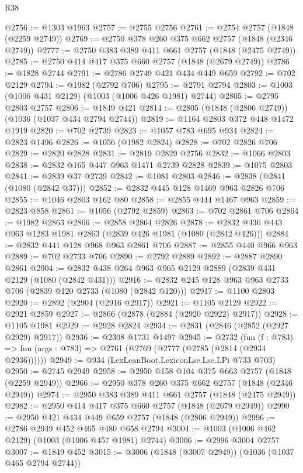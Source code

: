 \begin{lexlean}{R38}
\begin{coremodule}
@2756 := @1303 @1963
@2757 := @2755 @2756
@2761 := @2754 @2757 (@1848 (@2259 @2749))
@2769 := @2750 @378 @260 @375 @662 @2757 (@1848 (@2346 @2749))
@2777 := @2750 @383 @389 @411 @661 @2757 (@1848 (@2475 @2749))
@2785 := @2750 @414 @417 @375 @660 @2757 (@1848 (@2679 @2749))
@2786 := @1828 @2744
@2791 := @2786 @2749 @421 @434 @449 @659
@2792 := @702 @2129
@2794 := @1982 (@2792 @706)
@2795 := @2791 @2794
@2803 := @1003 (@1006 @431 @2129) (@1003 (@1006 @426 @1981) @2744)
@2805 := @2795 @2803 @2757
@2806 := @1849 @421
@2814 := @2805 (@1848 (@2806 @2749)) (@1036 (@1037 @434 @2794 @2744))
@2819 := @1164 @2803 @372 @448 @1472 @1919
@2820 := @702 @2739
@2823 := @1057 @783 @695 @934
@2824 := @2823 @1496
@2826 := @1056 (@1982 @2824)
@2828 := @702 @2826 @706
@2829 := @2820 @2828
@2831 := @2819 @2829 @2756
@2832 := @1066 @2803
@2838 := @2832 @165 @447 @963 @1471 @2739 @2828
@2839 := @1075 @2803
@2841 := @2839 @37 @2739
@2842 := @1081 @2803
@2846 := @2838 (@2841 (@1080 (@2842 @37)))
@2852 := @2832 @445 @128 @1469 @963 @2826 @706
@2855 := @1046 @2803 @162 @80
@2858 := @2855 @444 @1467 @963
@2859 := @2823 @858
@2861 := @1056 (@2792 @2859)
@2863 := @702 @2861 @706
@2864 := @1982 @2863
@2866 := @2858 @2864 @2826
@2878 := @2832 @436 @443 @963 @1283 @1981 @2863 (@2839 @426 @1981 (@1080 (@2842 @426)))
@2884 := @2832 @441 @128 @968 @963 @2861 @706
@2887 := @2855 @440 @966 @963
@2889 := @702 @2733 @706
@2890 := @2792 @2889
@2892 := @2887 @2890 @2861
@2904 := @2832 @438 @264 @963 @965 @2129 @2889 (@2839 @431 @2129 (@1080 (@2842 @431)))
@2916 := @2832 @245 @128 @963 @963 @2733 @706 (@2839 @120 @2733 (@1080 (@2842 @120)))
@2917 := @1100 @2803
@2920 := @2892 (@2904 (@2916 @2917))
@2921 := @1105 @2129
@2922 := @2921 @2859
@2927 := @2866 (@2878 (@2884 (@2920 @2922) @2917))
@2928 := @1105 @1981
@2929 := @2928 @2824
@2934 := @2831 (@2846 (@2852 (@2927 @2929) @2917))
@2936 := @2308 @1731 @1497
@2945 := @2732
    (fun (f : @783) => fun (args : @783) => @2761 (@2769 (@2777 (@2785 (@2814 (@2934 @2936))))))
@2949 := @934 (LexLeanBoot.LexiconLse.Lse.LPi @733 @703)
@2950 := @2745 @2949
@2958 := @2950 @158 @104 @375 @663 @2757 (@1848 (@2259 @2949))
@2966 := @2950 @378 @260 @375 @662 @2757 (@1848 (@2346 @2949))
@2974 := @2950 @383 @389 @411 @661 @2757 (@1848 (@2475 @2949))
@2982 := @2950 @414 @417 @375 @660 @2757 (@1848 (@2679 @2949))
@2990 := @2950 @421 @434 @449 @659 @2757 (@1848 (@2806 @2949))
@2996 := @2786 @2949 @452 @465 @480 @658 @2794
@3004 := @1003 (@1006 @462 @2129) (@1003 (@1006 @457 @1981) @2744)
@3006 := @2996 @3004 @2757
@3007 := @1849 @452
@3015 := @3006 (@1848 (@3007 @2949)) (@1036 (@1037 @465 @2794 @2744))

\end{coremodule}
\end{lexlean}
